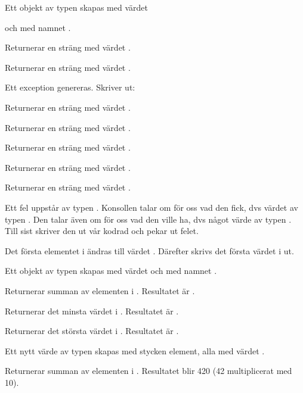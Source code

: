 \SOLUTION


\TaskSolved \what


\SubtaskSolved  Ett objekt av typen  skapas med värdet

 och med namnet .

\SubtaskSolved  Returnerar en sträng med värdet .

\SubtaskSolved  Returnerar en sträng med värdet \code{!}.

\SubtaskSolved  Ett exception genereras. Skriver ut:


\SubtaskSolved  Returnerar en sträng med värdet .

\SubtaskSolved  Returnerar en sträng med värdet .

\SubtaskSolved  Returnerar en sträng med värdet .

\SubtaskSolved  Returnerar en sträng med värdet .

\SubtaskSolved  Returnerar en sträng med värdet .

\SubtaskSolved  Ett fel uppstår av typen . Konsollen talar om för oss vad den fick, dvs värdet  av typen . Den talar även om för oss vad den ville ha, dvs något värde av typen . Till sist skriver den ut vår kodrad och pekar ut felet.

\SubtaskSolved  Det första elementet i  ändras till värdet . Därefter skrivs det första värdet i  ut.

\SubtaskSolved  Ett objekt av typen  skapas med värdet  och med namnet .

\SubtaskSolved  Returnerar summan av elementen i . Resultatet är .

\SubtaskSolved  Returnerar det minsta värdet i . Resultatet är .

\SubtaskSolved  Returnerar det största värdet i . Resultatet är .

\SubtaskSolved  Ett nytt värde av typen  skapas med  stycken element, alla med värdet .

\SubtaskSolved  Returnerar summan av elementen i . Resultatet blir 420 (42 multiplicerat med 10).

